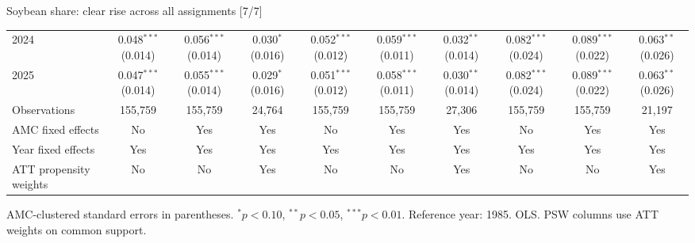 \documentclass[aspectratio=169]{beamer}
\begin{document}
\begin{frame}{Soybean share: clear rise across all assignments [7/7]}
{\begin{tabular}{@{}l*{9}{c}@{}}
2024 & \shortstack{0.048$^{***}$\\(0.014)} & \shortstack{0.056$^{***}$\\(0.014)} & \shortstack{0.030$^{*}$\\(0.016)} & \shortstack{0.052$^{***}$\\(0.012)} & \shortstack{0.059$^{***}$\\(0.011)} & \shortstack{0.032$^{**}$\\(0.014)} & \shortstack{0.082$^{***}$\\(0.024)} & \shortstack{0.089$^{***}$\\(0.022)} & \shortstack{0.063$^{**}$\\(0.026)} \\
2025 & \shortstack{0.047$^{***}$\\(0.014)} & \shortstack{0.055$^{***}$\\(0.014)} & \shortstack{0.029$^{*}$\\(0.016)} & \shortstack{0.051$^{***}$\\(0.012)} & \shortstack{0.058$^{***}$\\(0.011)} & \shortstack{0.030$^{**}$\\(0.014)} & \shortstack{0.082$^{***}$\\(0.024)} & \shortstack{0.089$^{***}$\\(0.022)} & \shortstack{0.063$^{**}$\\(0.026)} \\
\midrule
Observations & 155,759 & 155,759 & 24,764 & 155,759 & 155,759 & 27,306 & 155,759 & 155,759 & 21,197 \\
AMC fixed effects & No & Yes & Yes & No & Yes & Yes & No & Yes & Yes \\
Year fixed effects & Yes & Yes & Yes & Yes & Yes & Yes & Yes & Yes & Yes \\
ATT propensity weights & No & No & Yes & No & No & Yes & No & No & Yes \\
\bottomrule
\end{tabular}%
}
\vspace{0.1em}
{\tiny\color{ZMidGray} AMC-clustered standard errors in parentheses. $^{*}p<0.10$, $^{**}p<0.05$, $^{***}p<0.01$. Reference year: 1985. OLS. PSW columns use ATT weights on common support.}
\end{frame}
\end{document}
